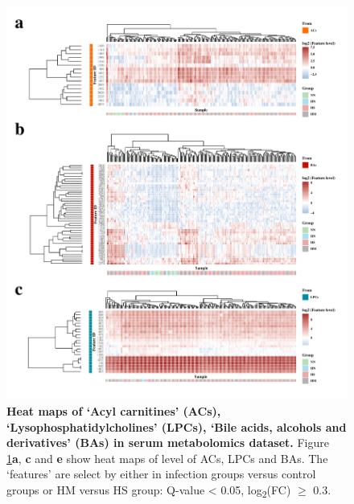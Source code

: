 \documentclass[
]{article}
\begin{document}
\begin{figure}
\hypertarget{fig:hps}{%
\centering
\includegraphics{fig6.hps.pdf}
\caption{\textbf{Heat maps of `Acyl carnitines' (ACs),
`Lysophosphatidylcholines' (LPCs), `Bile acids, alcohols and
derivatives' (BAs) in serum metabolomics dataset.} Figure
{\protect\NoHyper\ref{fig:hps}\protect\endNoHyper}\textbf{a}, \textbf{c}
and \textbf{e} show heat maps of level of ACs, LPCs and BAs. The
`features' are select by either in infection groups versus control
groups or HM versus HS group: Q-value \textless{} 0.05,
\textbar log\textsubscript{2}(FC)\textbar{} \(\geq\)
0.3.}\label{fig:hps}
}
\end{figure}
\end{document}
